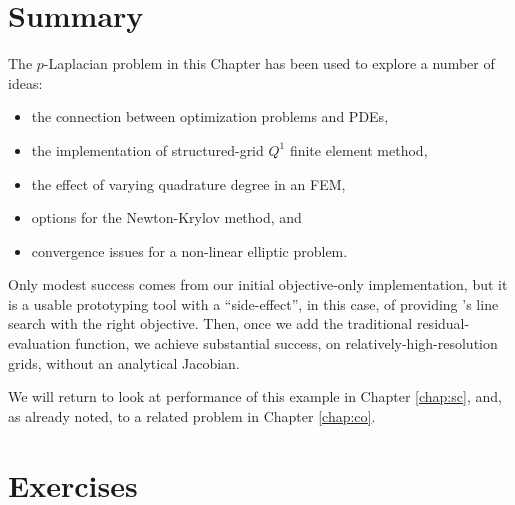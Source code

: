 \section{Summary}

The $p$-Laplacian problem in this Chapter has been used to explore a number of ideas:
\begin{itemize}
\item the connection between optimization problems and PDEs,
\item the implementation of structured-grid $Q^1$ finite element method,
\item the effect of varying quadrature degree in an FEM,
\item options for the Newton-Krylov method, and
\item convergence issues for a non-linear elliptic problem.
\end{itemize}

Only modest success comes from our initial objective-only implementation, but it is a usable prototyping tool with a ``side-effect'', in this case, of providing \PETSc's line search with the right objective.  Then, once we add the traditional residual-evaluation function, we achieve substantial success, on relatively-high-resolution grids, without an analytical Jacobian.

We will return to look at performance of this example in Chapter \ref{chap:sc}, and, as already noted, to a related problem in Chapter \ref{chap:co}.


\section{Exercises}

